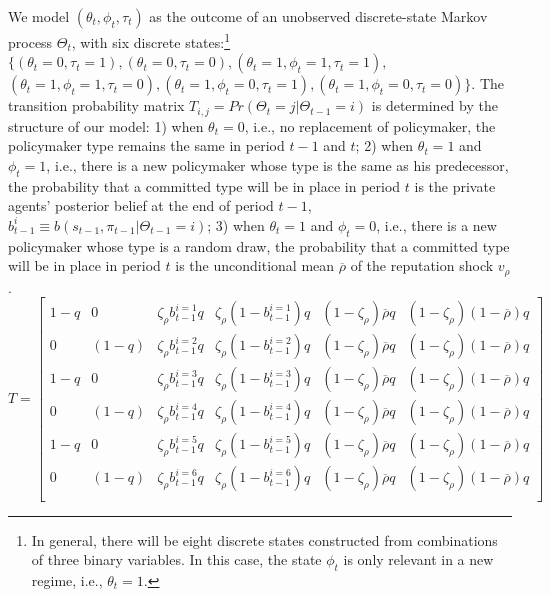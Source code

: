 \documentclass[12pt,letter,leqno]{article}
\theoremstyle{asn}
\theoremstyle{lem}
\theoremstyle{slem}
\theoremstyle{prop}
\theoremstyle{appprop}
\theoremstyle{rem}
\theoremstyle{defn}
\begin{document}
We model $(\theta_t,\phi_t,\tau_t)$ as the outcome of an unobserved discrete-state Markov process $\Theta_{t}$, with six discrete states:\footnote{In general, there will be eight discrete states constructed from combinations of three binary variables. In this case, the state $\phi_t$ is only relevant in a new regime, i.e., $\theta_t=1$.} $\{(\theta_t=0,\tau_t=1), (\theta_t=0,\tau_t=0), (\theta_t=1,\phi_t=1,\tau_t=1),$
$(\theta_t=1,\phi_t=1,\tau_t=0),(\theta_t=1,\phi_t=0,\tau_t=1),(\theta_t=1,\phi_t=0,\tau_t=0)\}$. The transition probability matrix $T_{i,j} = Pr(\Theta_t=j|\Theta_{t-1}=i)$ is determined by the structure of our model: 1) when $\theta_t=0$, i.e., no replacement of policymaker, the policymaker type remains the same in period $t-1$ and $t$; 2) when $\theta_t=1$ and $\phi_t=1$, i.e., there is a new policymaker whose type is the same as his predecessor, the probability that a committed type will be in place in period $t$ is the private agents' posterior belief at the end of period $t-1$, $b_{t-1}^{i}\equiv b(s_{t-1},\pi_{t-1}|\Theta_{t-1}=i)$; 3) when $\theta_t=1$ and $\phi_t=0$, i.e., there is a new policymaker whose type is a random draw, the probability that a committed type will be in place in period $t$ is the unconditional mean $\overline{\rho}$ of the reputation shock $v_{\rho}$. 
\begin{equation}\label{app:transmatrix}
T=
\begin{bmatrix}
1-q & 0 & \zeta_\rho b_{t-1}^{i=1} q & \zeta_\rho(1-b_{t-1}^{i=1})q & (1-\zeta_\rho)\overline{\rho}q & (1-\zeta_\rho)(1-\overline{\rho})q\\
0 & (1-q) & \zeta_\rho b_{t-1}^{i=2} q & \zeta_\rho(1-b_{t-1}^{i=2})q  & (1-\zeta_\rho)\overline{\rho}q & (1-\zeta_\rho)(1-\overline{\rho})q \\
1-q & 0 & \zeta_\rho b_{t-1}^{i=3} q & \zeta_\rho(1-b_{t-1}^{i=3})q  & (1-\zeta_\rho)\overline{\rho}q & (1-\zeta_\rho)(1-\overline{\rho})q \\
0 & (1-q) & \zeta_\rho b_{t-1}^{i=4} q & \zeta_\rho(1-b_{t-1}^{i=4})q  & (1-\zeta_\rho)\overline{\rho}q & (1-\zeta_\rho)(1-\overline{\rho})q \\
1-q & 0 & \zeta_\rho b_{t-1}^{i=5} q & \zeta_\rho(1-b_{t-1}^{i=5})q  & (1-\zeta_\rho)\overline{\rho}q & (1-\zeta_\rho)(1-\overline{\rho})q \\
0 & (1-q) & \zeta_\rho b_{t-1}^{i=6} q & \zeta_\rho(1-b_{t-1}^{i=6})q  & (1-\zeta_\rho)\overline{\rho}q & (1-\zeta_\rho)(1-\overline{\rho})q \\
\end{bmatrix}
\end{equation}
\end{document}
